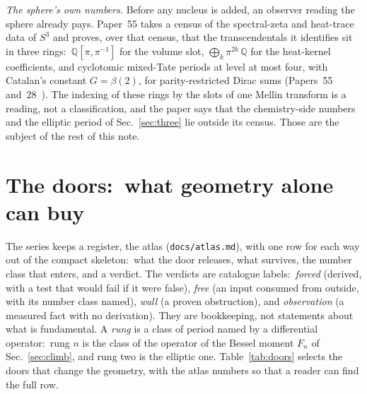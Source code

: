 \documentclass[aps,pra,twocolumn,superscriptaddress,longbibliography]{revtex4-2}
\begin{document}
\emph{The sphere's own numbers.}  Before any nucleus is added, an
observer reading the sphere already pays.  Paper~55 takes a census of the
spectral-zeta and heat-trace data of $S^3$ and proves, over that census,
that the transcendentals it identifies sit in three rings:\ $\mathbb{Q}[\pi,\pi^{-1}]$ for the volume slot,
$\bigoplus_k\pi^{2k}\,\mathbb{Q}$ for the heat-kernel coefficients, and
cyclotomic mixed-Tate periods at level at most four, with Catalan's
constant $G=\beta(2)$, for parity-restricted Dirac sums
(Papers~55 and~28~\cite{loutey_paper55,loutey_paper28}).  The indexing of
these rings by the slots of one Mellin transform is a reading, not a
classification, and the paper says that the chemistry-side numbers and
the elliptic period of Sec.~\ref{sec:three} lie outside its census.
Those are the subject of the rest of this note.

\section{The doors:\ what geometry alone can buy}
\label{sec:doors}

The series keeps a register, the atlas (\texttt{docs/atlas.md}), with one
row for each way out of the compact skeleton:\ what the door releases,
what survives, the number class that enters, and a verdict.  The
verdicts are catalogue labels:\ \emph{forced} (derived, with a test that
would fail if it were false), \emph{free} (an input consumed from
outside, with its number class named), \emph{wall} (a proven
obstruction), and \emph{observation} (a measured fact with no
derivation).  They are bookkeeping, not statements about what is
fundamental.  A \emph{rung} is a class of period named by a differential
operator:\ rung $n$ is the class of the operator of the Bessel moment
$F_n$ of Sec.~\ref{sec:climb}, and rung two is the elliptic one.  Table~\ref{tab:doors} selects the doors that change the
geometry, with the atlas numbers so that a reader can find the full row.
\end{document}
